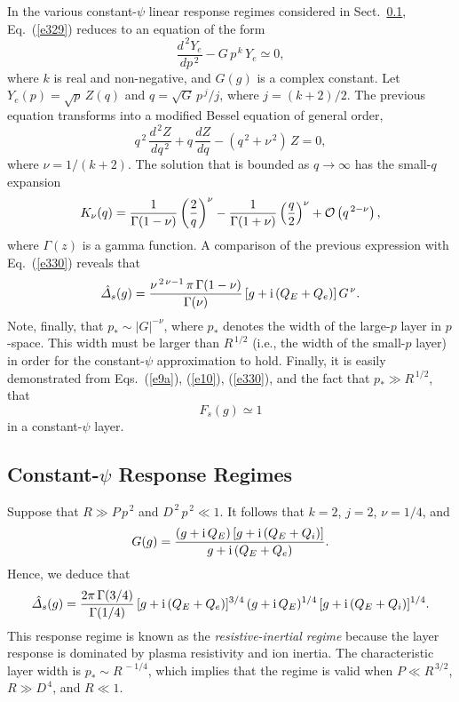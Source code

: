 \documentclass[titlepage=false,12pt]{article}
\begin{document}
In the various constant-$\psi$ linear response regimes considered in Sect.~\ref{scp}, Eq.~(\ref{e329}) reduces to an
equation of the form
\begin{equation}\label{e330a}
\frac{d^{\,2}Y_e}{d p^{\,2}}- G\,p^{\,k}\,Y_e\simeq 0,
\end{equation}
where $k$ is real and non-negative, and $G(g)$ is a complex constant. Let $Y_e(p)=\!\sqrt{p}\,Z(q)$ and $q=\!\sqrt{G}\,p^{\,j}/j$, where
$j=(k+2)/2$. The previous equation transforms into a modified Bessel equation of general order, 
\begin{equation}
q^{\,2}\,\frac{d^{\,2}Z}{dq^{\,2}} + q\,\frac{dZ}{dq} - (q^{\,2}+\nu^{\,2})\,Z =0,
\end{equation}
where $\nu=1/(k+2)$. The solution that is bounded as $q\rightarrow \infty$ has the small-$q$
expansion 
\begin{equation}\label{e332}
K_\nu(q)= \frac{1}{{\Gamma}(1-\nu)}\left(\frac{2}{q}\right)^\nu - \frac{1}{{\Gamma}(1+\nu)}\left(\frac{q}{2}\right)^\nu + {\cal O}\left(q^{\,2-\nu}\right),
\end{equation}
where $\Gamma(z)$ is a gamma function.
A comparison of the previous expression with Eq.~(\ref{e330}) reveals that
\begin{equation}
\hat{\mit\Delta}_s(g) =  \frac{\nu^{\,2\,\nu-1}\,\pi\,\Gamma(1-\nu)}{\Gamma(\nu)}\left[g+{\rm i}\,(Q_E+Q_e)\right]G^{\,\nu}.
\end{equation}
Note, finally, that $p_\ast\sim |G|^{-\nu}$, where $p_\ast$ denotes the width of the large-$p$ layer in $p$-space. This width must be larger than $R^{\,1/2}$ (i.e., the width of the small-$p$ layer) in order for the constant-$\psi$ approximation to hold.
Finally, it is easily demonstrated from Eqs.~(\ref{e9a}), (\ref{e10}), (\ref{e330}), and the fact that $p_\ast \gg R^{\,1/2}$, that
\begin{equation}\label{efeq1}
F_s(g)\simeq 1
\end{equation}
in a constant-$\psi$ layer. 

\subsection{Constant-$\psi$ Response Regimes}\label{scp}
Suppose that $R\gg P\,p^{\,2}$ and $D^{\,2}\,p^{\,2} \ll 1$. It follows that $k=2$, $j=2$, $\nu=1/4$, and
\begin{equation}
G(g) = \frac{(g+{\rm i}\,Q_E)\,[g+{\rm i}\,(Q_E+Q_i)]}{g+{\rm i}\,(Q_E+Q_e)}.
\end{equation}
Hence, we deduce that
\begin{equation}\label{ri}
\hat{\mit\Delta}_s(g) = \frac{2\pi\,\Gamma(3/4)}{\Gamma(1/4)}\,[g+{\rm i}\,(Q_E+Q_e)]^{3/4}\,(g
+{\rm i}\,Q_E)^{1/4}\,[g+{\rm i}\,(Q_E+Q_i)]^{1/4}.
\end{equation}
This response regime is known as the {\em resistive-inertial regime}\/ because the layer response is dominated by
plasma resistivity and ion inertia. The characteristic layer width is $p_\ast \sim R^{\,-1/4}$,
which implies that the regime is valid when $P\ll R^{\,3/2}$, $R\gg D^{\,4}$, and $R\ll 1$. 
\end{document}
